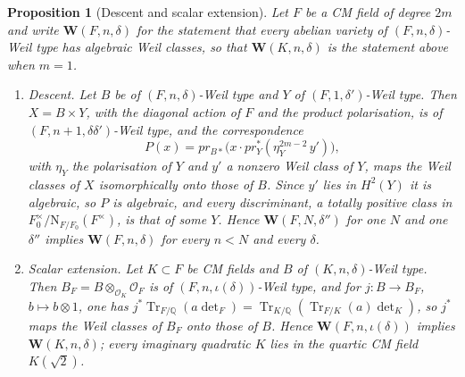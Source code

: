 \documentclass[11pt,reqno]{amsart}
\theoremstyle{plain}
\newtheorem{proposition}[theorem]{Proposition}
\theoremstyle{definition}
\theoremstyle{remark}
\newcommand{\QQ}{\mathbb{Q}}
\newcommand{\cO}{\mathcal{O}}
\newcommand{\Nm}{\mathrm{N}}             %
\DeclareMathOperator{\Tr}{Tr}
\begin{document}
\begin{proposition}[Descent and scalar extension]\label{prop:descent}
Let $F$ be a CM field of degree $2m$ and write $\mathbf{W}(F,n,\delta)$ for
the statement that every abelian variety of $(F,n,\delta)$-Weil type has
algebraic Weil classes, so that $\mathbf{W}(K,n,\delta)$ is the statement
above when $m=1$.
\begin{enumerate}[label=\textup{(\roman*)},leftmargin=2.6em]
\item \emph{Descent.} Let $B$ be of $(F,n,\delta)$-Weil type and $Y$ of
  $(F,1,\delta')$-Weil type. Then $X=B\times Y$, with the diagonal action of
  $F$ and the product polarisation, is of $(F,n+1,\delta\delta')$-Weil type,
  and the correspondence
  \[
    P(x)=pr_{B*}\bigl(x\cdot pr_{Y}^{*}(\eta_{Y}^{2m-2}\,y')\bigr),
  \]
  with $\eta_{Y}$ the polarisation of $Y$ and $y'$ a nonzero Weil class of
  $Y$, maps the Weil classes of $X$ isomorphically onto those of $B$. Since
  $y'$ lies in $H^{2}(Y)$ it is algebraic, so $P$ is algebraic, and every
  discriminant, a totally positive class in
  $F_{0}^{\times}/\Nm_{F/F_{0}}(F^{\times})$, is that of some $Y$.
  Hence $\mathbf{W}(F,N,\delta'')$ for one $N$ and one $\delta''$ implies
  $\mathbf{W}(F,n,\delta)$ for every $n<N$ and every $\delta$.
\item \emph{Scalar extension.} Let $K\subset F$ be CM fields and $B$ of
  $(K,n,\delta)$-Weil type. Then $B_{F}=B\otimes_{\cO_{K}}\cO_{F}$ is of
  $(F,n,\iota(\delta))$-Weil type, and for $j\colon B\to B_{F}$,
  $b\mapsto b\otimes1$, one has
  $j^{*}\Tr_{F/\QQ}(a\det_{F})=\Tr_{K/\QQ}(\Tr_{F/K}(a)\det_{K})$, so $j^{*}$
  maps the Weil classes of $B_{F}$ onto those of $B$. Hence
  $\mathbf{W}(F,n,\iota(\delta))$ implies $\mathbf{W}(K,n,\delta)$; every
  imaginary quadratic $K$ lies in the quartic CM field $K(\sqrt2)$.
\end{enumerate}
\end{proposition}
\end{document}
